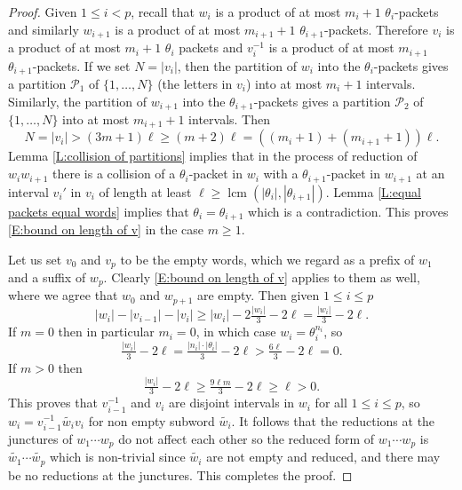 \documentclass[10pt,a4paper]{amsart}
\newcommand{\C}[1]{\mathcal{#1}}
\newcommand{\OP}[1]{\operatorname{#1}}
\begin{document}
\begin{proof}
Given $1 \leq i <p$, recall that $w_i$ is a product of at most $m_i+1$ $\theta_i$-packets and similarly $w_{i+1}$ is a product of at most $m_{i+1}+1$ $\theta_{i+1}$-packets.
Therefore $v_i$ is a product of at most $m_i+1$ $\theta_i$ packets and $v_i^{-1}$ is a product of at most $m_{i+1}$ $\theta_{i+1}$-packets.
If we set $N=|v_i|$, then the partition of $w_i$ into the $\theta_i$-packets gives a partition $\C P_1$ of $\{1,\dots,N\}$ (the letters in $v_i$) into at most $m_i+1$ intervals.
Similarly, the partition of $w_{i+1}$ into the $\theta_{i+1}$-packets gives a partition $\C P_2$ of $\{1,\dots,N\}$ %
into at most $m_{i+1}+1$ intervals.
Then
\[
N = 
|v_i| > 
(3m+1)\ell \geq %
(m+2)\ell =
((m_i+1)+(m_{i+1}+1))\ell.
\]
Lemma \ref{L:collision of partitions} implies that in the process of reduction of $w_iw_{i+1}$ there is a collision of a $\theta_i$-packet in $w_i$ with a $\theta_{i+1}$-packet in $w_{i+1}$ at an interval $v_i'$ in $v_i$ of length at least $\ell \geq \OP{lcm}(|\theta_i|,|\theta_{i+1}|)$.
Lemma \ref{L:equal packets equal words} implies that $\theta_i=\theta_{i+1}$ which is a contradiction. %
This proves \eqref{E:bound on length of v} in the case $m \geq 1$.

Let us set $v_0$ and $v_p$ to be the empty words, which we regard as a prefix of $w_1$ and a suffix of $w_p$.
Clearly \eqref{E:bound on length of v} applies to them as well, where we agree that $w_0$ and $w_{p+1}$ are empty.
Then given $1 \leq i \leq p$
\[
|w_i|-|v_{i-1}|-|v_i| \geq
|w_i| - 2 \tfrac{|w_i|}{3} - 2\ell =
\tfrac{|w_i|}{3} - 2\ell.
\]
If $m=0$ then in particular $m_i=0$, in which case $w_i=\theta_i^{n_i}$, so
\[
\tfrac{|w_i|}{3} - 2\ell  = \tfrac{|n_i| \cdot |\theta_i|}{3} - 2\ell > \tfrac{6\ell}{3}-2\ell =0.
\]
If $m>0$ then 
\[
\tfrac{|w_i|}{3} - 2\ell \geq \tfrac{9\ell m}{3}-2\ell \geq \ell >0.
\]
This proves that $v_{i-1}^{-1}$ and $v_i$ are disjoint intervals in $w_i$ for all $1 \leq i \leq p$, so $w_i=v_{i-1}^{-1}\widetilde{w_i}v_i$ for non empty subword $\widetilde{w_i}$.
It follows that the reductions at the junctures of $w_1 \cdots w_p$ do not affect each other so the reduced form of $w_1\cdots w_p$ is $\widetilde{w_1}\cdots \widetilde{w_p}$ which is non-trivial since $\widetilde{w_i}$ are not empty and reduced, and there may be no reductions at the junctures.
This completes the proof.
\end{proof}
\end{document}
